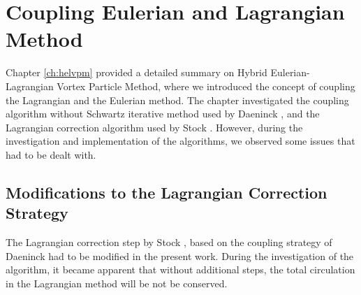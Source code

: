\chapter{Coupling Eulerian and Lagrangian Method}
\label{ch:coupling}


Chapter \ref{ch:helvpm} provided a detailed summary on Hybrid Eulerian-Lagrangian Vortex Particle Method, where we introduced the concept of coupling the Lagrangian and the Eulerian method. The chapter investigated the coupling algorithm without Schwartz iterative method used by Daeninck \cite{Daeninck2006}, and the Lagrangian correction algorithm used by Stock \cite{Stock2010a}. However, during the investigation and implementation of the algorithms, we observed some issues that had to be dealt with.

\section{Modifications to the Lagrangian Correction Strategy}
\label{seec:coupling-mthlcs}
The Lagrangian correction step by Stock \cite{Stock2010a}, based on the coupling strategy of Daeninck \cite{Daeninck2006} had to be modified in the present work. During the investigation of the algorithm, it became apparent that without additional steps, the total circulation in the Lagrangian method will be not be conserved.

